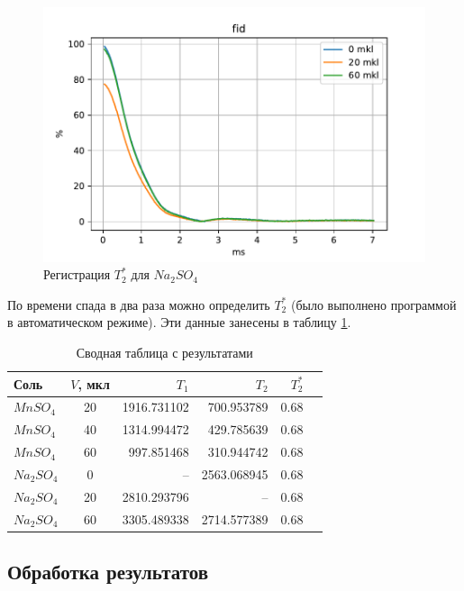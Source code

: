 \begin{figure}[h]
	\hspace{-5em}
	\includegraphics[width=1.2\linewidth]{data/Na_fid}
	\caption{Регистрация $ T_2^* $ для $ Na_2 SO_4 $}
	\label{fig:nafid}
\end{figure}

По времени спада в два раза можно определить $ T_2^* $ (было выполнено программой в автоматическом режиме). Эти данные занесены в таблицу \ref{table:all-T}.



\begin{table}[ht]
	\caption{Сводная таблица с результатами}
	\label{table:all-T}
	\centering
	\begin{tabular}{|l|c|r|r|r|r|}
		\toprule
		Соль &     $V$, мкл &          $T_1$ &          $T_2$ &  $T_2^*$ \\
		\midrule
		$MnSO_4$  	&  20 &  1916.731102 &   700.953789 &  0.68 \\
		$MnSO_4$  	&  40 &  1314.994472 &   429.785639 &  0.68 \\
		$MnSO_4$ 	&  60 &   997.851468 &   310.944742 &  0.68 \\
		$Na_2 SO_4$ &   0 &          --	 &  2563.068945 &  0.68 \\
		$Na_2 SO_4$ &  20 &  2810.293796 &          --  &  0.68 \\
		$Na_2 SO_4$ &  60 &  3305.489338 &  2714.577389 &  0.68 \\
		\bottomrule
	\end{tabular}
\end{table}

\subsection{Обработка результатов}